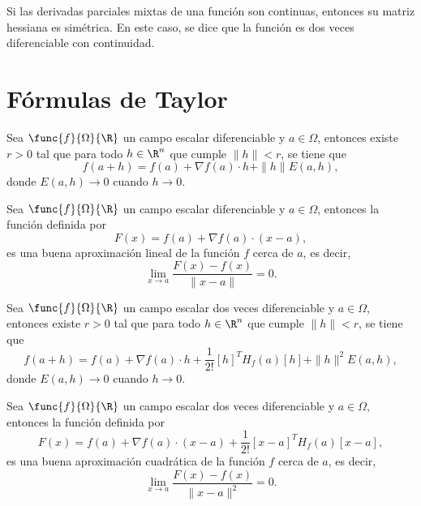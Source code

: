 \documentclass[a4,11pt]{aleph-notas}
\begin{document}
\begin{advertencia}
    Si las derivadas parciales mixtas de una función son continuas, entonces su matriz hessiana es simétrica. En este caso, se dice que la función es dos veces diferenciable con continuidad.
\end{advertencia}

\newpage
\section{Fórmulas de Taylor}

\begin{teo}
    Sea $\func{f}{\Omega}{\R}$ un campo escalar diferenciable y $a\in \Omega$, entonces existe $r>0$ tal que para todo $h\in\R^n$ que cumple $\|h\|<r$, se tiene que
    \[
        f(a+h) = f(a) + \nabla f(a) \cdot h + \|h\| E(a,h),
    \]
    donde $E(a,h)\to 0$ cuando $h\to 0$.
\end{teo}

\begin{prop}
    Sea $\func{f}{\Omega}{\R}$ un campo escalar diferenciable y $a\in \Omega$, entonces la función definida por
    \[
        F(x) = f(a) + \nabla f(a) \cdot (x-a),
    \]
    es una buena aproximación lineal de la función $f$ cerca de $a$, es decir,
    \[
        \lim_{x\to a} \frac{F(x)-f(x)}{\|x-a\|} = 0.
    \]
\end{prop}

\begin{teo}
    Sea $\func{f}{\Omega}{\R}$ un campo escalar dos veces diferenciable y $a\in \Omega$, entonces existe $r>0$ tal que para todo $h\in\R^n$ que cumple $\|h\|<r$, se tiene que
    \[
        f(a+h) = f(a) + \nabla f(a) \cdot h +  \frac{1}{2!}[h]^T H_f(a) [h] +\|h\|^2 E(a,h),
    \]
    donde $E(a,h)\to 0$ cuando $h\to 0$.
\end{teo}

\begin{prop}
    Sea $\func{f}{\Omega}{\R}$ un campo escalar dos veces diferenciable y $a\in \Omega$, entonces la función definida por
    \[
        F(x) = f(a) + \nabla f(a) \cdot (x-a) + \frac{1}{2!}[x-a]^T H_f(a) [x-a],
    \]
    es una buena aproximación cuadrática de la función $f$ cerca de $a$, es decir,
    \[
        \lim_{x\to a} \frac{F(x)-f(x)}{\|x-a\|^2} = 0.
    \]
\end{prop}
\end{document}
